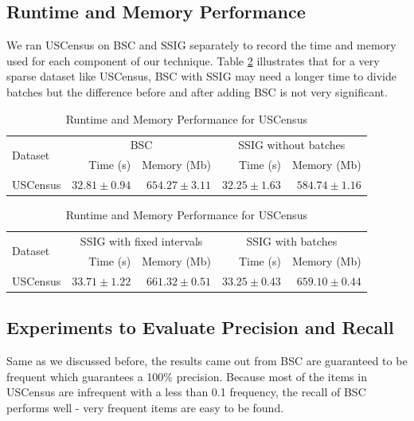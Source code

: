 \subsection{Runtime and Memory Performance}
We ran USCensus on BSC and SSIG separately to record the time and memory used for each component of our technique. Table \ref{tb:time2} illustrates that for a very sparse dataset like USCensus, BSC with SSIG may need a longer time to divide batches but the difference before and after adding BSC is not very significant.

\begin{table}[h!]
\caption{Runtime and Memory Performance for USCensus}
\label{tb:time2}
\begin{center}
\addtolength{\tabcolsep}{5.0pt}
\begin{tabular}{lrrrr}
    \toprule
    \multirow{2}{*}{Dataset} &
      \multicolumn{2}{c}{BSC} &
      \multicolumn{2}{c}{SSIG without batches} \\
      & {Time (s)} & {Memory (Mb)} & {Time (s)} & {Memory (Mb)} \\
      \midrule
    USCensus & \textbf{\(32.81\pm 0.94\)} & {\(654.27\pm 3.11\)} & {\(32.25\pm 1.63\)} & {\(584.74\pm 1.16\)} \\
    \bottomrule
\end{tabular}


\noalign{\smallskip}

\begin{tabular}{lrrrr}
    \toprule
    \multirow{2}{*}{Dataset} &
      \multicolumn{2}{c}{SSIG with fixed intervals} &
      \multicolumn{2}{c}{SSIG with batches} \\
      & {Time (s)} & {Memory (Mb)} & {Time (s)} & {Memory (Mb)} \\
      \midrule
    USCensus & {\(33.71\pm 1.22\)} & {\(661.32\pm 0.51\)} & {\(33.25\pm 0.43\)} & {\(659.10\pm 0.44\)} \\
    \bottomrule
\end{tabular}
\end{center}
\end{table}

\subsection{Experiments to Evaluate Precision and Recall}

Same as we discussed before, the results came out from BSC are guaranteed to be frequent which guarantees a 100\% precision. Because most of the items in USCensus are infrequent with a less than 0.1 frequency, the recall of BSC performs well - very frequent items are easy to be found. 

